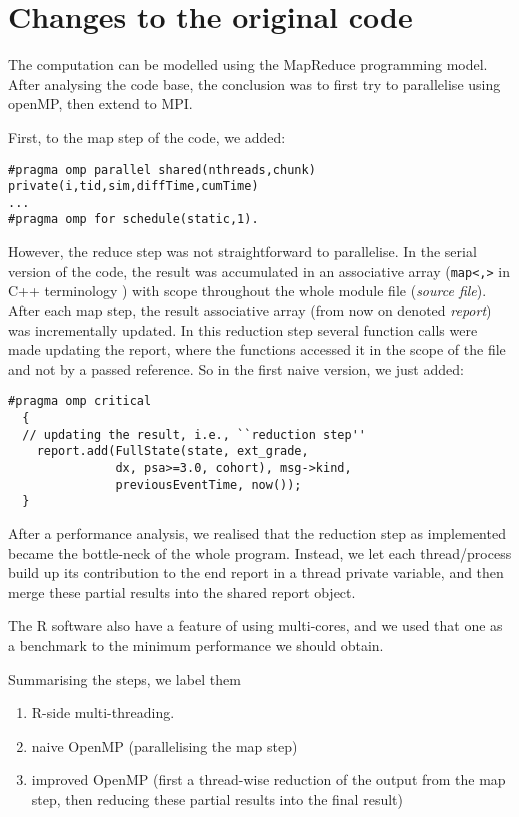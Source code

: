 
\section{Changes to the original code}
The computation can be modelled using the MapReduce programming model. After
analysing the code base, the conclusion was to first try to
parallelise using openMP, then extend to MPI.

First, to the map step of the code, we added:
\begin{lstlisting}
#pragma omp parallel shared(nthreads,chunk) private(i,tid,sim,diffTime,cumTime)
...
#pragma omp for schedule(static,1).
\end{lstlisting}
However, the reduce step was not straightforward to parallelise. In
the serial version of the code, the result was accumulated in an
associative array (\texttt{map<,>} in C++ terminology ) with scope
throughout the whole module file (\emph{source file}). After each map
step, the result associative array (from now on denoted \emph{report})
was incrementally updated. In this reduction step several function
calls were made updating the report, where the functions
accessed it in the scope of the file and not by a passed reference. So
in the first naive version, we just added:
\lstset{language=C++}
\begin{lstlisting}
#pragma omp critical
  {
  // updating the result, i.e., ``reduction step''
    report.add(FullState(state, ext_grade,
               dx, psa>=3.0, cohort), msg->kind,
               previousEventTime, now());
  }
\end{lstlisting}

After a performance analysis, we realised that the reduction step as
implemented became the bottle-neck of the whole program. Instead, we
let each thread/process build up its contribution to the end report in
a thread private variable, and then merge these partial results into the
shared report object.

The R software also have a feature of using multi-cores, and we used
that one as a benchmark to the minimum performance we should obtain.

Summarising the steps, we label them
\begin{enumerate}
\item R-side multi-threading.
\item naive OpenMP (parallelising the map step)
\item improved OpenMP (first a thread-wise reduction of the output
  from the map step, then
  reducing these partial results into the final result)
\end{enumerate}


